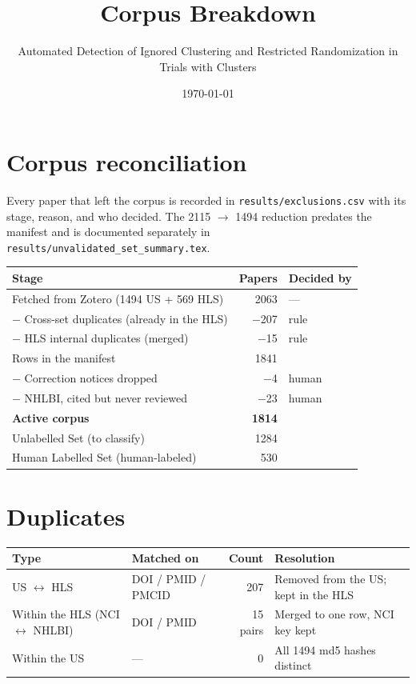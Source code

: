 \documentclass[11pt]{article}
\title{Corpus Breakdown}
\author{Automated Detection of Ignored Clustering and Restricted Randomization in Trials with Clusters}
\date{\today}
\begin{document}
\maketitle
\vspace{-2em}

\section{Corpus reconciliation}

Every paper that left the corpus is recorded in \texttt{results/exclusions.csv} with its stage, reason,
and who decided. The 2115 $\rightarrow$ 1494 reduction predates the manifest and is documented separately
in \texttt{results/unvalidated\_set\_summary.tex}.

\begin{table}[h]
\centering
\begin{tabular}{lrl}
\toprule
\textbf{Stage} & \textbf{Papers} & \textbf{Decided by} \\
\midrule
Fetched from Zotero (1494 US + 569 HLS) & 2063 & --- \\
\quad $-$ Cross-set duplicates (already in the HLS) & $-$207 & rule \\
\quad $-$ HLS internal duplicates (merged) & $-$15 & rule \\
\midrule
Rows in the manifest & 1841 & \\
\quad $-$ Correction notices dropped & $-$4 & human \\
\quad $-$ NHLBI, cited but never reviewed & $-$23 & human \\
\midrule
\textbf{Active corpus} & \textbf{1814} & \\
\quad Unlabelled Set (to classify) & 1284 & \\
\quad Human Labelled Set (human-labeled) & 530 & \\
\bottomrule
\end{tabular}
\end{table}

\section{Duplicates}

\begin{table}[h]
\centering
\begin{tabular}{llrl}
\toprule
\textbf{Type} & \textbf{Matched on} & \textbf{Count} & \textbf{Resolution} \\
\midrule
US $\leftrightarrow$ HLS & DOI / PMID / PMCID & 207 & Removed from the US; kept in the HLS \\
Within the HLS (NCI $\leftrightarrow$ NHLBI) & DOI / PMID & 15 pairs & Merged to one row, NCI key kept \\
Within the US & --- & 0 & All 1494 md5 hashes distinct \\
\bottomrule
\end{tabular}
\end{table}
\end{document}
